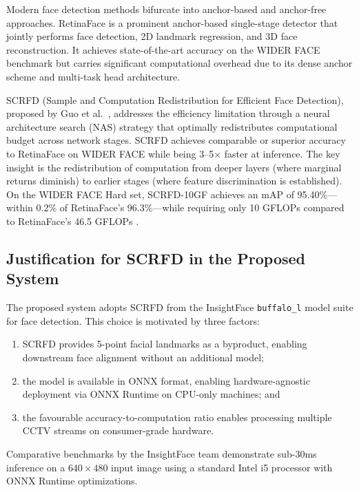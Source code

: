 \documentclass[12pt, a4paper]{article}
\begin{document}
Modern face detection methods bifurcate into anchor-based and anchor-free approaches. RetinaFace \cite{deng2020retinaface} is a prominent anchor-based single-stage detector that jointly performs face detection, 2D landmark regression, and 3D face reconstruction. It achieves state-of-the-art accuracy on the WIDER FACE benchmark \cite{yang2016widerface} but carries significant computational overhead due to its dense anchor scheme and multi-task head architecture.

SCRFD (Sample and Computation Redistribution for Efficient Face Detection), proposed by Guo et al.\ \cite{guo2022scrfd}, addresses the efficiency limitation through a neural architecture search (NAS) strategy that optimally redistributes computational budget across network stages. SCRFD achieves comparable or superior accuracy to RetinaFace on WIDER FACE while being 3--5$\times$ faster at inference. The key insight is the redistribution of computation from deeper layers (where marginal returns diminish) to earlier stages (where feature discrimination is established). On the WIDER FACE Hard set, SCRFD-10GF achieves an mAP of 95.40\%---within 0.2\% of RetinaFace's 96.3\%---while requiring only 10 GFLOPs compared to RetinaFace's 46.5 GFLOPs \cite{guo2022scrfd}.

\subsection{Justification for SCRFD in the Proposed System}

The proposed system adopts SCRFD from the InsightFace \texttt{buffalo\_l} model suite for face detection. This choice is motivated by three factors:
\begin{enumerate}[label=(\arabic*)]
    \item SCRFD provides 5-point facial landmarks as a byproduct, enabling downstream face alignment without an additional model;
    \item the model is available in ONNX format, enabling hardware-agnostic deployment via ONNX Runtime on CPU-only machines; and
    \item the favourable accuracy-to-computation ratio enables processing multiple CCTV streams on consumer-grade hardware.
\end{enumerate}

Comparative benchmarks by the InsightFace team \cite{guo2021insightface} demonstrate sub-30ms inference on a $640\times480$ input image using a standard Intel i5 processor with ONNX Runtime optimizations.
\end{document}
